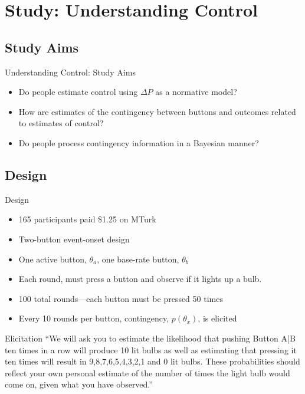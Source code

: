\documentclass{beamer}
\newcommand{\deltap}{$\Delta P$}
\begin{document}
\section{Study: Understanding Control}

\subsection*{Study Aims}
\begin{frame}{Understanding Control: Study Aims}
	\begin{itemize}
		\item Do people estimate control using \deltap \xspace as a normative model?
		\item How are estimates of the contingency between buttons and outcomes related to estimates of control?
		\item Do people process contingency information in a Bayesian manner?
	\end{itemize}
\end{frame}

\subsection*{Design}
\begin{frame}{Design}
	\begin{itemize}
		\item 165 participants paid \$1.25 on MTurk
		\item Two-button event-onset design
		\item One active button, ${\theta}_a$, one base-rate button, ${\theta}_b$
		\item Each round, must press a button and observe if it lights up a bulb.
		\item 100 total rounds---each button must be pressed 50 times
		\item Every 10 rounds per button, contingency, $p({\theta}_x)$, is elicited
	\end{itemize}
\end{frame}

\begin{frame}{Elicitation}
``We will ask you to estimate the likelihood that pushing Button A|B ten times in a row will produce 10 lit bulbs as well as estimating that pressing it ten times will result in 9,8,7,6,5,4,3,2,1 and 0 lit bulbs. These probabilities should reflect your own personal estimate of the number of times the light bulb would come on, given what you have observed.''
\end{frame}
\end{document}
